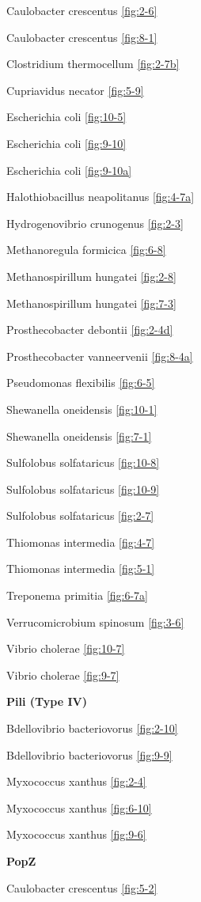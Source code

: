 \documentclass[]{tufte-book}
\begin{document}
Caulobacter crescentus \ref{fig:2-6}

Caulobacter crescentus \ref{fig:8-1}

Clostridium thermocellum \ref{fig:2-7b}

Cupriavidus necator \ref{fig:5-9}

Escherichia coli \ref{fig:10-5}

Escherichia coli \ref{fig:9-10}

Escherichia coli \ref{fig:9-10a}

Halothiobacillus neapolitanus \ref{fig:4-7a}

Hydrogenovibrio crunogenus \ref{fig:2-3}

Methanoregula formicica \ref{fig:6-8}

Methanospirillum hungatei \ref{fig:2-8}

Methanospirillum hungatei \ref{fig:7-3}

Prosthecobacter debontii \ref{fig:2-4d}

Prosthecobacter vanneervenii \ref{fig:8-4a}

Pseudomonas flexibilis \ref{fig:6-5}

Shewanella oneidensis \ref{fig:10-1}

Shewanella oneidensis \ref{fig:7-1}

Sulfolobus solfataricus \ref{fig:10-8}

Sulfolobus solfataricus \ref{fig:10-9}

Sulfolobus solfataricus \ref{fig:2-7}

Thiomonas intermedia \ref{fig:4-7}

Thiomonas intermedia \ref{fig:5-1}

Treponema primitia \ref{fig:6-7a}

Verrucomicrobium spinosum \ref{fig:3-6}

Vibrio cholerae \ref{fig:10-7}

Vibrio cholerae \ref{fig:9-7}

\textbf{Pili (Type IV)}

Bdellovibrio bacteriovorus \ref{fig:2-10}

Bdellovibrio bacteriovorus \ref{fig:9-9}

Myxococcus xanthus \ref{fig:2-4}

Myxococcus xanthus \ref{fig:6-10}

Myxococcus xanthus \ref{fig:9-6}

\textbf{PopZ}

Caulobacter crescentus \ref{fig:5-2}
\end{document}
